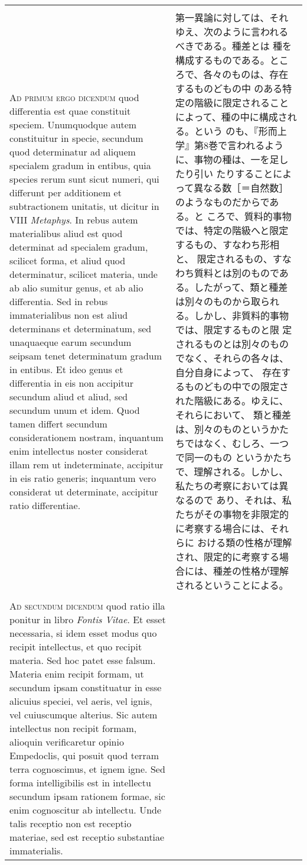 \documentclass[10pt]{jsarticle} %
\begin{document}
\begin{longtable}{p{21em}p{21em}}
\\\\


 {\scshape Ad primum ergo dicendum} quod differentia est quae
 constituit speciem. Unumquodque autem constituitur in specie,
 secundum quod determinatur ad aliquem specialem gradum in entibus,
 quia species rerum sunt sicut numeri, qui differunt per additionem et
 subtractionem unitatis, ut dicitur in VIII {\itshape Metaphys}. In
 rebus autem materialibus aliud est quod determinat ad specialem
 gradum, scilicet forma, et aliud quod determinatur, scilicet materia,
 unde ab alio sumitur genus, et ab alio differentia. Sed in rebus
 immaterialibus non est aliud determinans et determinatum, sed
 unaquaeque earum secundum seipsam tenet determinatum gradum in
 entibus. Et ideo genus et differentia in eis non accipitur secundum
 aliud et aliud, sed secundum unum et idem. Quod tamen differt
 secundum considerationem nostram, inquantum enim intellectus noster
 considerat illam rem ut indeterminate, accipitur in eis ratio
 generis; inquantum vero considerat ut determinate, accipitur ratio
 differentiae.


&

 第一異論に対しては、それゆえ、次のように言われるべきである。種差とは
 種を構成するものである。ところで、各々のものは、存在するものどもの中
 のある特定の階級に限定されることによって、種の中に構成される。という
 のも、『形而上学』第8巻で言われるように、事物の種は、一を足したり引い
 たりすることによって異なる数［＝自然数］のようなものだからである。と
 ころで、質料的事物では、特定の階級へと限定するもの、すなわち形相と、
 限定されるもの、すなわち質料とは別のものである。したがって、類と種差
 は別々のものから取られる。しかし、非質料的事物では、限定するものと限
 定されるものとは別々のものでなく、それらの各々は、自分自身によって、
 存在するものどもの中での限定された階級にある。ゆえに、それらにおいて、
 類と種差は、別々のものというかたちではなく、むしろ、一つで同一のもの
 というかたちで、理解される。しかし、私たちの考察においては異なるので
 あり、それは、私たちがその事物を非限定的に考察する場合には、それらに
 おける類の性格が理解され、限定的に考察する場合には、種差の性格が理解
 されるということによる。



\\\\


{\scshape Ad secundum dicendum} quod ratio illa ponitur in libro
{\itshape Fontis Vitae}. Et esset necessaria, si idem esset modus quo
recipit intellectus, et quo recipit materia. Sed hoc patet esse
falsum. Materia enim recipit formam, ut secundum ipsam constituatur in
esse alicuius speciei, vel aeris, vel ignis, vel cuiuscumque
alterius. Sic autem intellectus non recipit formam, alioquin
verificaretur opinio Empedoclis, qui posuit quod terram terra
cognoscimus, et ignem igne. Sed forma intelligibilis est in intellectu
secundum ipsam rationem formae, sic enim cognoscitur ab
intellectu. Unde talis receptio non est receptio materiae, sed est
receptio substantiae immaterialis.



\end{longtable}
\end{document}
